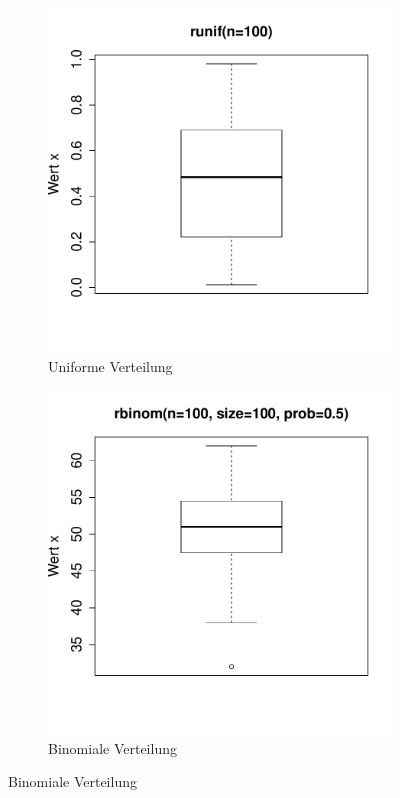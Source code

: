 \begin{figure}[h!]
\centering
\begin{subfigure}[b]{0.48\textwidth}
\includegraphics{r-cmd-030}
\caption{Uniforme Verteilung}
\end{subfigure}
\begin{subfigure}[b]{0.48\textwidth}
\includegraphics{r-cmd-031}
\caption{Binomiale Verteilung}
\end{subfigure}


\end{figure}
